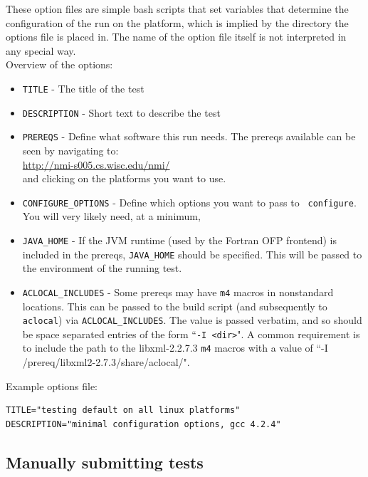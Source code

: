 These option files are simple bash scripts that set variables that determine the
configuration of the run on the platform, which is implied by the directory the
options file is placed in.  The name of the option file itself is not
interpreted in any special way.\\

Overview of the options:
\begin{itemize}
 \item {\tt TITLE} - The title of the test
 \item {\tt DESCRIPTION} - Short text to describe the test
 \item {\tt PREREQS} - Define what software this run needs. The prereqs available
                       can be seen by navigating to: \\
                       \url{http://nmi-s005.cs.wisc.edu/nmi/} \\
                       and clicking on the platforms you want to use.
 \item {\tt CONFIGURE\_OPTIONS} - Define which options you want to pass to {\tt
                         configure}.  You will very likely need, at a minimum,

 \item {\tt JAVA\_HOME} - If the JVM runtime (used by the Fortran OFP frontend)
                         is included in the prereqs, {\tt JAVA\_HOME} should be
                         specified. This will be passed to the environment of
                         the running test.

 \item {\tt ACLOCAL\_INCLUDES} - Some prereqs may have {\tt m4} macros in
 nonstandard locations.  This can be passed to the build script (and
 subsequently to {\tt aclocal}) via {\tt ACLOCAL\_INCLUDES}.  The value is
 passed verbatim, and so should be space separated entries of the form ``{\tt -I
 <dir>}".  A common requirement is to include the path to the libxml-2.2.7.3
 {\tt m4} macros with a value of ``-I /prereq/libxml2-2.7.3/share/aclocal/".
 \end{itemize}

Example options file:
\begin{verbatim}
TITLE="testing default on all linux platforms"
DESCRIPTION="minimal configuration options, gcc 4.2.4"
\end{verbatim}


\subsection{Manually submitting tests}%
\label{sec:nmi:submitting-tests}


